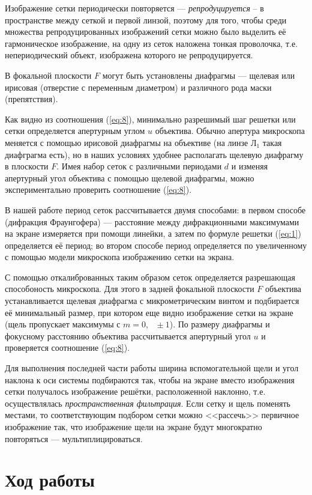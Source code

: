 \documentclass[a4paper, 12pt]{article}
\begin{document}
	Изображение сетки периодически повторяется — \textit{репродуцируется} – в пространстве между сеткой и первой линзой, поэтому для того, чтобы среди множества репродуцированных изображений сетки можно было выделить её гармоническое изображение, на одну из сеток наложена  тонкая проволочка, т.е. непериодический объект, изображена которого не репродуцируется.\par
	В фокальной плоскости $F$ могут быть установлены диафрагмы — щелевая или ирисовая (отверстие с переменным диаметром) и различного рода маски (препятствия).\par
	Как видно из соотношения (\ref{eq:8}), минимально разрешимый шаг решетки или сетки определяется апертурным углом $u$ объектива. Обычно апертура микроскопа меняется с помощью ирисовой диафрагмы на объективе (на линзе $\text{Л}_1$ такая диафграгма есть), но в наших условиях удобнее располагать щелевую диафрагму в плоскости $F$. Имея набор сеток с различными периодами $d$ и изменяя апертурный угол объектива с помощью щелевой диафрагмы, можно экспериментально проверить соотношение (\ref{eq:8}).\par
	В нашей работе период сеток рассчитывается двумя способами: в первом способе (дифракция Фраунгофера) — расстояние между дифракционными максимумами на экране измеряется при помощи линейки, а затем по формуле решетки (\ref{eq:1}) определяется её период; во втором способе период определяется по увеличенному с помощью модели микроскопа изображению сетки на экрана.\par
	С помощью откалиброванных таким образом сеток определяется разрешающая способоность микроскопа. Для этого в задней фокальной плоскости $F$ объектива устанавливается щелевая диафрагма с микрометрическим винтом и подбирается её минимальный размер, при котором еще видно изображение сетки на экране (щель пропускает максимумы с $m=0,\text{ }\pm1$). По размеру диафрагмы и фокусному расстоянию объектива рассчитывается апертурный угол $u$ и проверяется соотношение (\ref{eq:8}).\par
	Для выполнения последней части работы ширина вспомогательной щели и угол наклона к оси системы подбираются так, чтобы на экране вместо изображения сетки получалось изображение решётки, расположенной наклонно, т.е. осуществлялась \textit{пространственная фильтрация}. Если сетку и щель поменять местами, то соответствующим подбором сетки можно <<рассечь>> первичное изображение так, что изображение щели на экране будут многократно повторяться — мультиплицироваться.
	\section{Ход работы}
\end{document}
